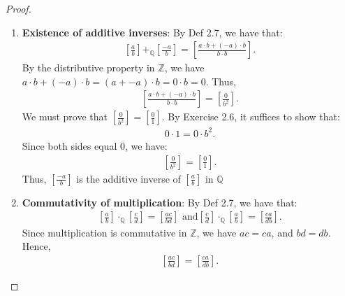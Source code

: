 \documentclass[11pt]{article}
\begin{document}
\begin{proof}
\begin{enumerate}[label=(\alph*)]
\begin{align*}
    \left[\frac{a}{b}\right]+_{\mathbb{Q}}\left[\frac{0}{1}\right] = \left[\frac{a\cdot 1 + 0 \cdot b}{b \cdot 1}\right].
    \end{align*}
    By the multiplicative and additive identities in $\mathbb{Z}$, we have $a \cdot 1 = a$ and $0 \cdot b = 0$. Thus,
    \begin{align*}
    \left[\frac{a\cdot 1 + 0 \cdot b}{b \cdot 1}\right] = \left[\frac{a + 0}{b}\right] = \left[\frac{a}{b}\right].
    \end{align*}
    Therefore, $\left[\frac{0}{1}\right]$ is the additive identity in $\mathbb{Q}$.
    \item \textbf{Existence of additive inverses}:
    By Def 2.7, we have that:
    \begin{align*}
    \left[\frac{a}{b}\right]+_{\mathbb{Q}}\left[\frac{-a}{b}\right] = \left[\frac{a \cdot b + (-a) \cdot b}{b \cdot b}\right].
    \end{align*}
    By the distributive property in $\mathbb{Z}$, we have $a \cdot b + (-a) \cdot b = (a + -a) \cdot b = 0 \cdot b = 0$. Thus,
    \begin{align*}
    \left[\frac{a \cdot b + (-a) \cdot b}{b \cdot b}\right] = \left[\frac{0}{b^2}\right].
    \end{align*}    
    We must prove that $\left[\frac{0}{b^2}\right] = \left[\frac{0}{1}\right]$.
    By Exercise 2.6, it suffices to show that:
    \begin{align*}
    0 \cdot 1 = 0 \cdot b^2.
    \end{align*}
    Since both sides equal 0, we have:
    \begin{align*}
    \left[\frac{0}{b^2}\right] = \left[\frac{0}{1}\right].
    \end{align*}
    Thus, $\left[\frac{-a}{b}\right]$ is the additive inverse of $\left[\frac{a}{b}\right]$ in $\mathbb{Q}$
    \item \textbf{Commutativity of multiplication}:
    By Def 2.7, we have that:
    \begin{align*}
    \left[\frac{a}{b}\right]\cdot_{\mathbb{Q}} \left[\frac{c}{d}\right] = \left[\frac{ac}{bd}\right] \text{ and}
    \left[\frac{c}{d}\right]\cdot_{\mathbb{Q}} \left[\frac{a}{b}\right] = \left[\frac{ca}{db}\right].
    \end{align*}
    Since multiplication is commutative in $\mathbb{Z}$, we have $ac = ca$, and $bd = db$. \\
    Hence,
    \begin{align*}
    \left[\frac{ac}{bd}\right] = \left[\frac{ca}{db}\right].

\end{align*}
\end{enumerate}
\end{proof}
\end{document}
